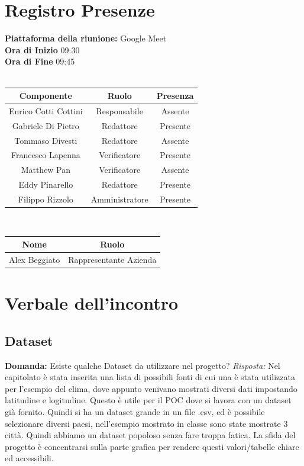\documentclass{article}
\begin{document}
\section{Registro Presenze}
\textbf{Piattaforma della riunione:} Google Meet \\
\textbf{Ora di Inizio} 09:30\\
\textbf{Ora di Fine} 09:45\\
\\
\begin{tabular}{|c|c|c|}
    \hline
    \textbf{Componente} & \textbf{Ruolo} & \textbf{Presenza}\\
    \hline
    Enrico Cotti Cottini & Responsabile & Assente \\ 
    \hline
    Gabriele Di Pietro & Redattore & Presente \\ 
    \hline
    Tommaso Divesti & Redattore & Assente \\ 
    \hline 
    Francesco Lapenna & Verificatore & Presente \\ 
    \hline
    Matthew Pan & Verificatore & Assente \\ 
    \hline 
    Eddy Pinarello & Redattore & Presente \\ 
    \hline 
    Filippo Rizzolo & Amministratore & Presente \\ 
    \hline 
\end{tabular}
\\
\newline
\newline
\begin{tabular}{|c|c|}
    \hline
    \textbf{Nome} & \textbf{Ruolo}\\
    \hline
    Alex Beggiato & Rappresentante Azienda \\
    \hline
\end{tabular}
\newpage

\section{Verbale dell'incontro}
\subsection{Dataset}
\textbf{Domanda:} Esiste qualche Dataset da utilizzare nel progetto?
\newline
\textit{Risposta:} Nel capitolato è stata inserita una lista di possibili fonti di cui una è stata utilizzata per l’esempio del clima, dove appunto venivano mostrati diversi dati impostando latitudine e logitudine. Questo è utile per il POC dove si lavora con un dataset già fornito. 
Quindi si ha un dataset grande in un file .csv, ed è possibile selezionare diversi paesi, nell’esempio mostrato in classe sono state mostrate 3 città. Quindi abbiamo un dataset popoloso senza fare troppa fatica.
La sfida del progetto è concentrarsi sulla parte grafica per rendere questi valori/tabelle chiare ed accessibili.
\end{document}
